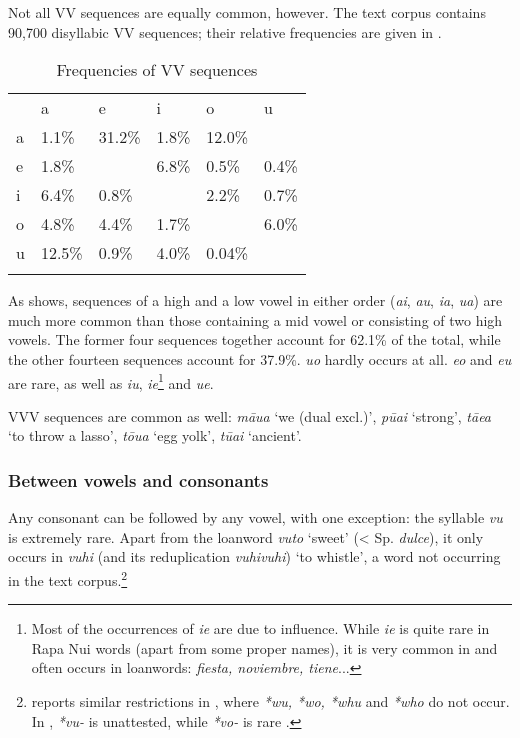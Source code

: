 Not all VV sequences are equally common, however. The text corpus contains 90,700 disyllabic VV sequences; their relative frequencies are given in .

\begin{table} 
\begin{tabularx}{\textwidth}{XR{1.8cm}R{1.5cm}R{1.8cm}R{1.8cm}R{2cm}}
\lsptoprule

 & \parbox{1cm}{\centering a}& \parbox{1cm}{\centering e}& \parbox{1cm}{\centering i}& \parbox{1cm}{\centering o}& \parbox{1cm}{\centering u}\\
{ a}  &  1.1\%&  31.2\%&  1.8\%&  12.0\%\\
{ e}  &  1.8\%&  &  6.8\%&  0.5\%&  0.4\%\\
{ i}  &  6.4\%&  0.8\%&  &  2.2\%&  0.7\%\\
{ o}  &  4.8\%&  4.4\%&  1.7\%&  &  6.0\%\\
{ u}  &  12.5\%&  0.9\%&  4.0\%&  0.04\%& \\
\lspbottomrule
\end{tabularx}
\caption{Frequencies of VV sequences}
\label{tab:9}
\end{table}

As  shows, sequences of a high and a low vowel in either order (\textit{ai}, \textit{au}, \textit{ia}, \textit{ua}) are much more common than those containing a mid vowel or consisting of two high vowels. The former four sequences together account for 62.1\% of the total, while the other fourteen sequences account for 37.9\%. \textit{uo} hardly occurs at all. \textit{eo} and \textit{eu} are rare, as well as \textit{iu}, \textit{ie}\footnote{\label{fn:53}Most of the occurrences of \textit{ie} are due to  influence. While \textit{ie} is quite rare in Rapa Nui words (apart from some proper names), it is very common in  and often occurs in loanwords: \textit{fiesta, noviembre, tiene}...} and \textit{ue}. 

VVV sequences are common as well: \textit{māua} ‘we (dual excl.)’, \textit{pūai} ‘strong’, \textit{tāea} ‘to throw a lasso’, \textit{tōua} ‘egg yolk’, \textit{tūai} ‘ancient’.

\subsubsection{Between vowels and consonants}\label{sec:2.3.3.2}

Any consonant can be followed by any vowel, with one exception: the syllable \textit{vu} is extremely rare. Apart from the loanword \textit{vuto} ‘sweet’ ({\textless} Sp. \textit{dulce}), it only occurs in \textit{vuhi} (and its reduplication \textit{vuhivuhi}) ‘to whistle’, a word not occurring in the text corpus.\footnote{\label{fn:54}\citet{DeLacy1997} reports similar restrictions in , where \textit{*wu, *wo, *whu} and \textit{*who} do not occur. In , \textit{*vu-} is unattested, while \textit{*vo-} is rare \citep[612]{Besnier2000}.} 

